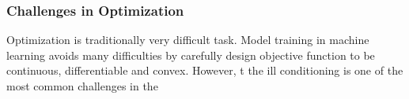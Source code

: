 \subsubsection{Challenges in Optimization}

Optimization is traditionally very difficult task. Model training in machine learning avoids many difficulties by carefully design objective function to be continuous, differentiable and convex. However, t
the ill conditioning is one of the most common challenges in the 
